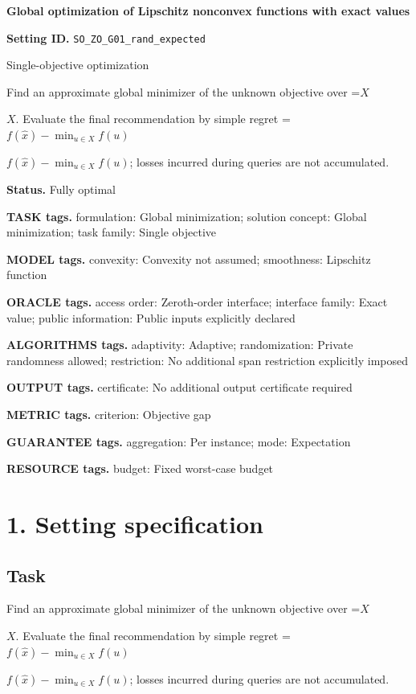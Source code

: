 \documentclass[10pt,a4paper]{article}
\newcommand{\AtlasMath}[1]{\par\begingroup\centering\setbox0=\hbox{$\displaystyle #1$}\ifdim\wd0>1.4\linewidth\typeout{ATLAS WIDE FORMULA: \the\wd0}\fi\ifdim\wd0>\linewidth\resizebox{\linewidth}{!}{\box0}\else\box0\fi\par\endgroup}
\newcommand{\AtlasInlineMath}[1]{\begingroup\setbox0=\hbox{$#1$}\ifdim\wd0>.4\linewidth\endgroup\AtlasMath{#1}\else\endgroup$#1$\fi}
\begin{document}
\raggedright

{\LARGE\bfseries\sffamily\color{AtlasNavy} Global optimization of Lipschitz nonconvex functions with exact values\par}\vspace{5pt}
\textbf{Setting ID.} \texttt{SO\_\allowbreak{}ZO\_\allowbreak{}G01\_\allowbreak{}rand\_\allowbreak{}expected}

Single-objective optimization

Find an approximate global minimizer of the unknown objective over \AtlasInlineMath{X}. Evaluate the final recommendation by simple regret \AtlasInlineMath{f(\widehat{x})-\min_{u\in X}f(u)}; losses incurred during queries are not accumulated.

\textbf{Status.} Fully optimal

\textbf{TASK tags.} formulation: Global minimization; solution concept: Global minimization; task family: Single objective

\textbf{MODEL tags.} convexity: Convexity not assumed; smoothness: Lipschitz function

\textbf{ORACLE tags.} access order: Zeroth-order interface; interface family: Exact value; public information: Public inputs explicitly declared

\textbf{ALGORITHMS tags.} adaptivity: Adaptive; randomization: Private randomness allowed; restriction: No additional span restriction explicitly imposed

\textbf{OUTPUT tags.} certificate: No additional output certificate required

\textbf{METRIC tags.} criterion: Objective gap

\textbf{GUARANTEE tags.} aggregation: Per instance; mode: Expectation

\textbf{RESOURCE tags.} budget: Fixed worst-case budget

\section{1. Setting specification}
\subsection{Task}
Find an approximate global minimizer of the unknown objective over \AtlasInlineMath{X}. Evaluate the final recommendation by simple regret \AtlasInlineMath{f(\widehat{x})-\min_{u\in X}f(u)}; losses incurred during queries are not accumulated.
\end{document}

